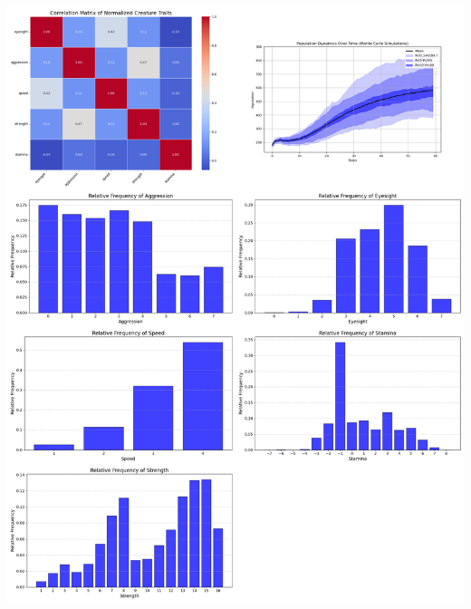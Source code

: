 \documentclass{article}
\begin{document}
\begin{center}
    \includegraphics[scale=0.21]{tests/2.9.jpg}
\end{center}
\end{document}
